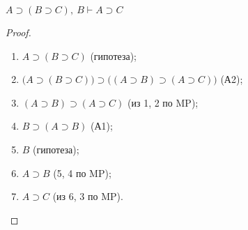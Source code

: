 \begin{lemma}\label{th:implication_and_middle}
    $A \supset (B \supset C),\ B \vdash A \supset C$
\end{lemma}
\begin{proof}\leavevmode
    \begin{enumerate}
        \item $A \supset (B \supset C)$ (гипотеза);
        \item $\big(A \supset (B \supset C)\big) \supset \big((A \supset B) \supset (A \supset C)\big)$ (А2);
        \item $(A \supset B) \supset (A \supset C)$ (из 1, 2 по MP);
        \item $B \supset (A \supset B)$ (А1);
        \item $B$ (гипотеза);
        \item $A \supset B$ (5, 4 по MP);
        \item $A \supset C$ (из 6, 3 по MP).
    \end{enumerate}
\end{proof}

